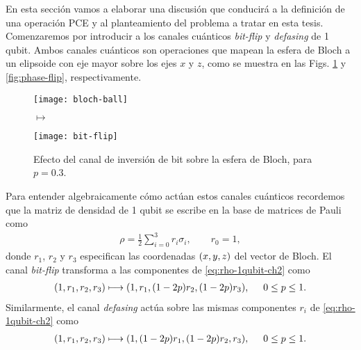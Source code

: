 %

En esta sección vamos a elaborar una discusión que conducirá a
la definición de una operación PCE y al planteamiento del problema
a tratar en esta tesis. 
Comenzaremos por introducir a los canales cuánticos  
\textit{bit-flip} y \textit{defasing} de 1 qubit. 
Ambos canales cuánticos son operaciones que mapean 
la esfera de Bloch a un elipsoide con eje mayor sobre los ejes $x$ y $z$, 
como se muestra en las Figs. \ref{fig:bit-flip} y \ref{fig:phase-flip}, 
respectivamente.
\begin{figure}
\centering
\begin{minipage}{.4\textwidth}
    \centering
    \texttt{[image: bloch-ball]}
\end{minipage}
\LARGE{$\longmapsto$}
\begin{minipage}{0.4\textwidth}
    \centering
    \texttt{[image: bit-flip]}
\end{minipage}
\caption{
Efecto del canal de inversión de bit sobre la esfera de Bloch, para $p=0.3$. \ep}
\label{fig:bit-flip}
\end{figure}
Para entender algebraicamente cómo actúan estos canales cuánticos 
recordemos que la matriz de densidad de 1 qubit se escribe en la 
base de matrices de Pauli como
\begin{align}\label{eq:rho-1qubit-ch2}
\rho=\frac{1}{2}\sum_{i=0}^3r_i\sigma_i,\qquad r_0=1,
\end{align}
donde $r_1$, $r_2$ y $r_3$ especifican las coordenadas $\qty(x,y,z)$ 
del vector de Bloch. El canal \textit{bit-flip} transforma a las componentes 
de \eqref{eq:rho-1qubit-ch2} como~\cite{nielsen_chuang_2011}
\begin{align}\label{eq:bit-flip-transformation}
\qty(1,r_1,r_2,r_3)\longmapsto \qty(1,r_1,(1-2p)r_2,(1-2p)r_3),
\hspace{.5cm} 0\leq p\leq 1.
\end{align}
Similarmente, el canal \textit{defasing} actúa sobre las mismas
componentes $r_i$ de \eqref{eq:rho-1qubit-ch2}
como~\cite{nielsen_chuang_2011}
\begin{align}\label{eq:defasing-transformation}
\qty(1,r_1,r_2,r_3)\longmapsto \qty(1,(1-2p)r_1,(1-2p)r_2,r_3),
\hspace{.5cm} 0\leq p\leq 1.
\end{align}
